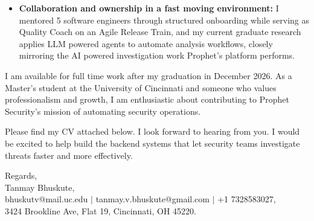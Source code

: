 \documentclass[11pt]{letter}
\begin{document}
\begin{letter}{}
\begin{itemize}[leftmargin=*, itemsep=0.45em]
    \item \textbf{Collaboration and ownership in a fast moving environment:} I mentored 5 software engineers through structured onboarding while serving as Quality Coach on an Agile Release Train, and my current graduate research applies LLM powered agents to automate analysis workflows, closely mirroring the AI powered investigation work Prophet's platform performs.
\end{itemize}

I am available for full time work after my graduation in December 2026. As a Master's student at the University of Cincinnati and someone who values professionalism and growth, I am enthusiastic about contributing to Prophet Security's mission of automating security operations.

Please find my CV attached below. I look forward to hearing from you. I would be excited to help build the backend systems that let security teams investigate threats faster and more effectively.

{\setlength{\parskip}{0pt}
Regards,\\
Tanmay Bhuskute,\\
bhuskutv@mail.uc.edu $\mid$ tanmay.v.bhuskute@gmail.com $\mid$ +1 7328583027,\\
3424 Brookline Ave, Flat 19, Cincinnati, OH 45220.
}

\end{letter}
\end{document}
